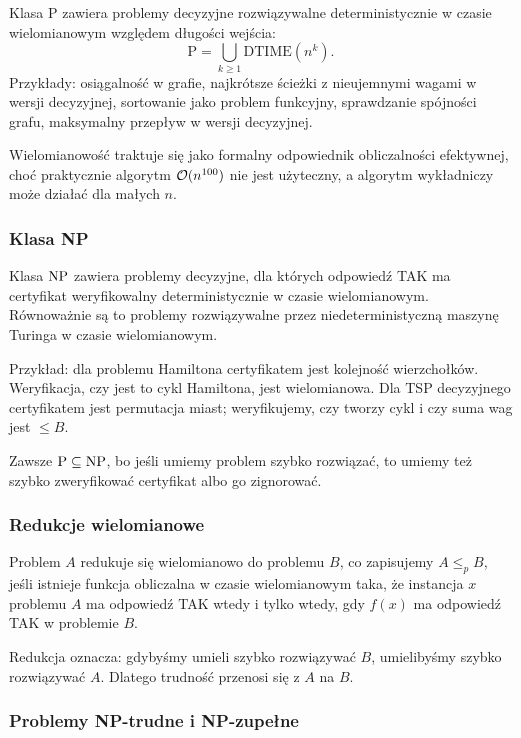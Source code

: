 Klasa $\mathrm{P}$ zawiera problemy decyzyjne rozwiązywalne deterministycznie w czasie wielomianowym względem długości wejścia:
\[
\mathrm{P}=\bigcup_{k\ge 1}\mathrm{DTIME}(n^k).
\]
Przykłady: osiągalność w grafie, najkrótsze ścieżki z nieujemnymi wagami w wersji decyzyjnej, sortowanie jako problem funkcyjny, sprawdzanie spójności grafu, maksymalny przepływ w wersji decyzyjnej.

Wielomianowość traktuje się jako formalny odpowiednik obliczalności efektywnej, choć praktycznie algorytm $\mathcal{O}(n^{100})$ nie jest użyteczny, a algorytm wykładniczy może działać dla małych $n$.

\subsubsection{Klasa NP}

Klasa $\mathrm{NP}$ zawiera problemy decyzyjne, dla których odpowiedź TAK ma certyfikat weryfikowalny deterministycznie w czasie wielomianowym. Równoważnie są to problemy rozwiązywalne przez niedeterministyczną maszynę Turinga w czasie wielomianowym.

Przykład: dla problemu Hamiltona certyfikatem jest kolejność wierzchołków. Weryfikacja, czy jest to cykl Hamiltona, jest wielomianowa. Dla TSP decyzyjnego certyfikatem jest permutacja miast; weryfikujemy, czy tworzy cykl i czy suma wag jest $\le B$.

Zawsze $\mathrm{P}\subseteq\mathrm{NP}$, bo jeśli umiemy problem szybko rozwiązać, to umiemy też szybko zweryfikować certyfikat albo go zignorować.

\subsubsection{Redukcje wielomianowe}

Problem $A$ redukuje się wielomianowo do problemu $B$, co zapisujemy $A\le_p B$, jeśli istnieje funkcja obliczalna w czasie wielomianowym taka, że instancja $x$ problemu $A$ ma odpowiedź TAK wtedy i tylko wtedy, gdy $f(x)$ ma odpowiedź TAK w problemie $B$.

Redukcja oznacza: gdybyśmy umieli szybko rozwiązywać $B$, umielibyśmy szybko rozwiązywać $A$. Dlatego trudność przenosi się z $A$ na $B$.

\subsubsection{Problemy NP-trudne i NP-zupełne}

